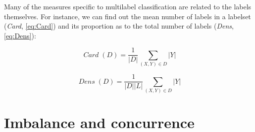 \documentclass[]{article}
\newcommand{\func}[1]{\operatorname{\mathit{#1}}} \newcommand{\const}[1]{\mathit{#1}} \newcommand{\abs}[1]{\left\lvert{#1}\right\rvert}
\begin{document}
Many of the measures specific to multilabel classification are related
to the labels themselves. For instance, we can find out the mean number
of labels in a labelset (\emph{Card}, \ref{eq:Card}) and its proportion
as to the total number of labels (\emph{Dens}, \ref{eq:Dens}):

\begin{equation} \func{Card}(D) = \frac 1 {\abs D} \sum_{(X,Y)\in D} \abs Y \label{eq:Card}\end{equation}

\begin{equation} \func{Dens}(D) = \frac 1 {\abs D \abs L} \sum_{(X,Y)\in D} \abs Y \label{eq:Dens}\end{equation}

\section{Imbalance and concurrence}\label{imbalance-and-concurrence}
\end{document}
